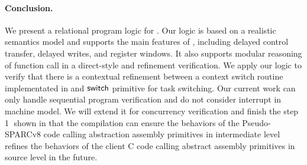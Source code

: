 \paragraph{\textbf{Conclusion.}}
We present a relational program logic for \sparc.
Our logic is based on a realistic semantics
model and supports the main features of \sparc,
including delayed control transfer, delayed writes,
and register windows.
It also supports modular reasoning of 
function call in a direct-style and 
refinement verification. 
We apply our logic to verify  
that there is a contextual refinement between 
a context switch routine implementated 
in \sparc{} and $\mathsf{switch}$ primitive for task switching.
Our current work can only handle
sequential \sparc{} program verification and 
do not consider interrupt in machine model.  
We will extend it for concurrency verification 
and finish the step {\color{blue} \textcircled{1}} shown in
\Fig{\ref{fig:idea to establish contextual refinement}}
that the compilation can ensure the behaviors 
of the Pseudo-SPARCv8 code calling abstraction assembly 
primitives in intermediate level refines 
the behaviors of 
the client C code calling abstract assembly primitives 
in source level in the future. 
